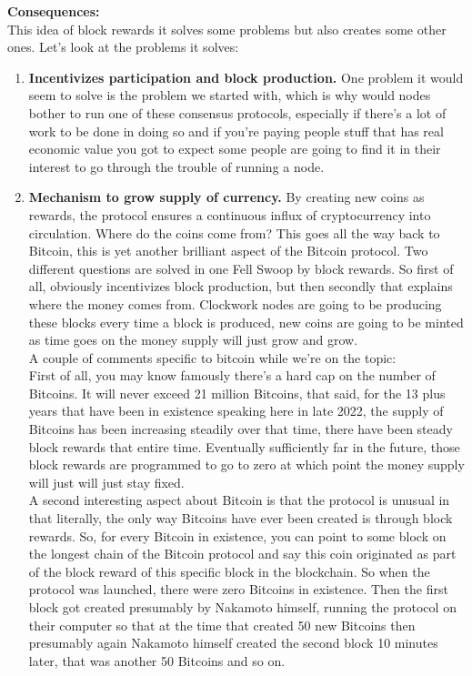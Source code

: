 \noindent
\textbf{Consequences:}\\
This idea of block rewards
it solves some problems but also creates
some other ones. Let's look at the problems it solves:
\begin{enumerate}
    \item \textbf{Incentivizes participation and block production.} One problem it would seem to solve is
the problem we started with, which is why would nodes bother to run one
of these consensus protocols, especially
if there's a lot of work to be done in
doing so and if you're
paying people stuff that has real
economic value you got to expect some
people are going to find it in their
interest to go through the trouble of
running a node.\\
    \item \textbf{Mechanism to grow supply of currency.} By creating new coins as rewards, the protocol ensures a continuous influx of cryptocurrency into circulation. Where do the coins come
from? This goes all the way back to Bitcoin, this is yet another brilliant aspect of the Bitcoin
protocol. Two different questions are solved in one Fell Swoop by block rewards. So first of all, obviously incentivizes block production,
but then secondly that explains where the money comes from. Clockwork nodes are going to be producing these blocks every time a
block is produced, new coins are going to be minted as time goes on the money supply will just grow and grow.\\

A couple of comments specific
to bitcoin while we're on the topic:\\
First of all, you may know famously there's a hard cap on
the number of Bitcoins. It will never
exceed 21 million Bitcoins,
that said, for the 13 plus
years that have been in existence
speaking here in late 2022,
the supply of Bitcoins has been
increasing steadily over that time, there
have been steady block rewards that
entire time. Eventually sufficiently far
in the future, those block rewards are
programmed to go to zero at which point
the money supply will just will just
stay fixed.\\

A second interesting aspect about Bitcoin is that the protocol is unusual in that literally, the only way Bitcoins have ever been
created is through block rewards. So, for every Bitcoin
in existence, you can point to some block on the longest chain of the Bitcoin
protocol and say this coin originated as part of the block reward
of this specific block in the blockchain. So when the protocol was launched, there were zero Bitcoins in existence. Then the first block 
got created presumably by Nakamoto himself, running the protocol on their computer so that at the time that created 50 new Bitcoins then 
presumably again Nakamoto himself created the second block 10 minutes later, that was another 50 Bitcoins and so on.
\end{enumerate}

